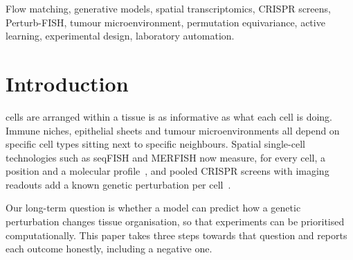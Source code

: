 \documentclass[journal]{IEEEtran}
\begin{document}
\begin{IEEEkeywords}
Flow matching, generative models, spatial transcriptomics, CRISPR screens, Perturb-FISH, tumour microenvironment, permutation equivariance, active learning, experimental design, laboratory automation.
\end{IEEEkeywords}

\section{Introduction}

 cells are arranged within a tissue is as informative as what each cell is doing. Immune niches, epithelial sheets and tumour microenvironments all depend on specific cell types sitting next to specific neighbours. Spatial single-cell technologies such as seqFISH and MERFISH now measure, for every cell, a position and a molecular profile~\cite{lohoff2022,palla2022}, and pooled CRISPR screens with imaging readouts add a known genetic perturbation per cell~\cite{binan2025}.

Our long-term question is whether a model can predict how a genetic perturbation changes tissue organisation, so that experiments can be prioritised computationally. This paper takes three steps towards that question and reports each outcome honestly, including a negative one.
\end{document}
